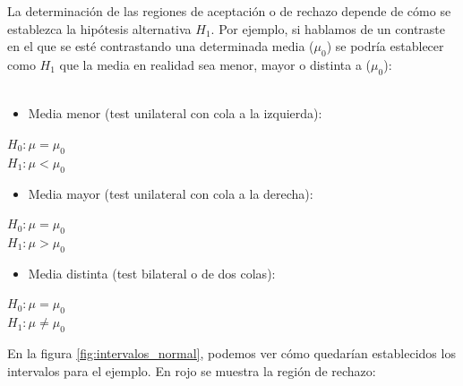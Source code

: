 La determinación de las regiones de aceptación o de rechazo depende de cómo se establezca la hipótesis
alternativa $H_1$. Por ejemplo, si hablamos de un contraste en el que se esté contrastando una determinada
media ($\mu_0$) se podría establecer como $H_1$ que la media en realidad sea menor, mayor o distinta a
($\mu_0$):\\\\
\begin{itemize}
\item Media menor (test unilateral con cola a la izquierda):
\end{itemize}
\begin{center}
$H_0: \mu = \mu_0$
\\$H_1: \mu < \mu_0$
\end{center}
\begin{itemize}
\item Media mayor (test unilateral con cola a la derecha):
\end{itemize}
\begin{center}
$H_0: \mu = \mu_0$
\\$H_1: \mu > \mu_0$
\end{center}
\begin{itemize}
\item Media distinta (test bilateral o de dos colas):
\end{itemize}
\begin{center}
$H_0: \mu = \mu_0$
\\$H_1: \mu \neq \mu_0$
\end{center}
En la figura \ref{fig:intervalos_normal}, podemos ver cómo quedarían establecidos los intervalos para el ejemplo. En
rojo se muestra la región de rechazo:
\begin{figure}[h]
\centering
{}
\end{figure}
